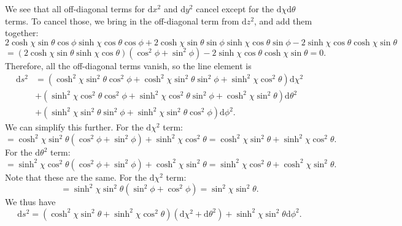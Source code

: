 \documentclass[11pt, letterpaper]{article}
\theoremstyle{plain}
\begin{document}
We see that all off-diagonal terms for $\mathrm{d} x^2$ and $\mathrm{d} y^2$ cancel except for the $\mathrm{d} \chi \mathrm{d} \theta $ terms. To cancel those, we bring in the off-diagonal term from $\mathrm{d} z^2$, and add them together:
\[
	2 \cosh\chi \sin \theta \cos \phi \sinh\chi \cos \theta \cos \phi +2 \cosh\chi \sin \theta \sin \phi \sinh\chi \cos \theta \sin \phi -2 \sinh\chi \cos \theta  \cosh\chi \sin \theta 
\]
\[
	=\left( 2 \cosh\chi \sin \theta \sinh\chi \cos \theta  \right) \left( \cos ^2\phi +\sin ^2\phi  \right) -2 \sinh\chi \cos \theta \cosh\chi \sin \theta =0
.\]
Therefore, all the off-diagonal terms vanish, so the line element is
\begin{align*}
	\mathrm{d} s^2&=\left( \cosh^2\chi \sin ^2\theta \cos ^2\phi +\cosh^2\chi \sin ^2\theta \sin ^2\phi +\sinh^2\chi \cos ^2\theta  \right) \mathrm{d} \chi ^2\\
		      &+\left( \sinh^2\chi \cos ^2\theta \cos ^2\phi +\sinh^2\chi \cos ^2\theta \sin^2\phi +\cosh^2\chi \sin ^2\theta  \right) \mathrm{d}\theta ^2\\
		      &+\left( \sinh^2\chi \sin ^2\theta \sin ^2\phi +\sinh^2\chi \sin ^2\theta \cos ^2\phi  \right) \mathrm{d} \phi ^2
.\end{align*}
We can simplify this further. For the $\mathrm{d} \chi ^2$ term:
\[
	=\cosh^2\chi \sin ^2\theta \left( \cos ^2\phi +\sin ^2\phi  \right) +\sinh^2\chi \cos ^2\theta =\cosh^2\chi \sin ^2\theta +\sinh^2\chi \cos ^2\theta 
.\]
For the $\mathrm{d} \theta ^2$ term:
\[
	=\sinh^2\chi \cos ^2\theta \left( \cos ^2\phi +\sin ^2\phi  \right) +\cosh^2\chi \sin ^2\theta =\sinh^2\chi \cos ^2\theta +\cosh^2\chi \sin ^2\theta 
.\]
Note that these are the same. For the $\mathrm{d} \chi ^2$ term:
\[
	=\sinh^2\chi \sin ^2\theta \left( \sin ^2\phi +\cos ^2\phi  \right) =\sin^2\chi \sin ^2\theta 
.\]
We thus have
\[
	\mathrm{d} s^2=\left( \cosh^2\chi \sin ^2\theta +\sinh^2\chi \cos ^2\theta  \right) \left( \mathrm{d} \chi ^2+\mathrm{d} \theta ^2 \right) +\sinh ^2\chi \sin ^2\theta \mathrm{d} \phi ^2
.\]
\end{document}
